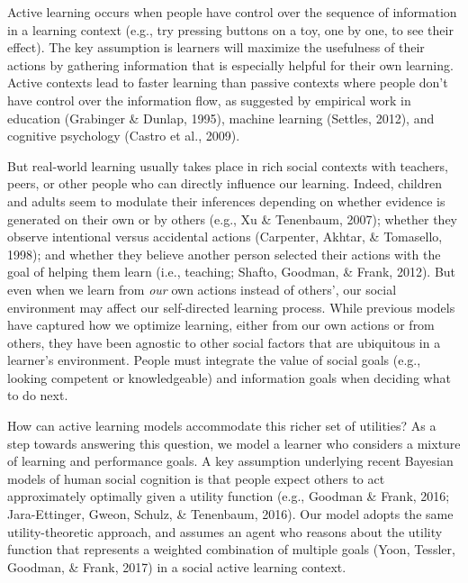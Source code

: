 \documentclass[10pt, letterpaper]{article}
\begin{document}
Active learning occurs when people have control over the sequence of
information in a learning context (e.g., try pressing buttons on a toy,
one by one, to see their effect). The key assumption is learners will
maximize the usefulness of their actions by gathering information that
is especially helpful for their own learning. Active contexts lead to
faster learning than passive contexts where people don't have control
over the information flow, as suggested by empirical work in education
(Grabinger \& Dunlap, 1995), machine learning (Settles, 2012), and
cognitive psychology (Castro et al., 2009).

But real-world learning usually takes place in rich social contexts with
teachers, peers, or other people who can directly influence our
learning. Indeed, children and adults seem to modulate their inferences
depending on whether evidence is generated on their own or by others
(e.g., Xu \& Tenenbaum, 2007); whether they observe intentional versus
accidental actions (Carpenter, Akhtar, \& Tomasello, 1998); and whether
they believe another person selected their actions with the goal of
helping them learn (i.e., teaching; Shafto, Goodman, \& Frank, 2012).
But even when we learn from \emph{our} own actions instead of others',
our social environment may affect our self-directed learning process.
While previous models have captured how we optimize learning, either
from our own actions or from others, they have been agnostic to other
social factors that are ubiquitous in a learner's environment. People
must integrate the value of social goals (e.g., looking competent or
knowledgeable) and information goals when deciding what to do next.

How can active learning models accommodate this richer set of utilities?
As a step towards answering this question, we model a learner who
considers a mixture of learning and performance goals. A key assumption
underlying recent Bayesian models of human social cognition is that
people expect others to act approximately optimally given a utility
function (e.g., Goodman \& Frank, 2016; Jara-Ettinger, Gweon, Schulz, \&
Tenenbaum, 2016). Our model adopts the same utility-theoretic approach,
and assumes an agent who reasons about the utility function that
represents a weighted combination of multiple goals (Yoon, Tessler,
Goodman, \& Frank, 2017) in a social active learning context.
\end{document}
